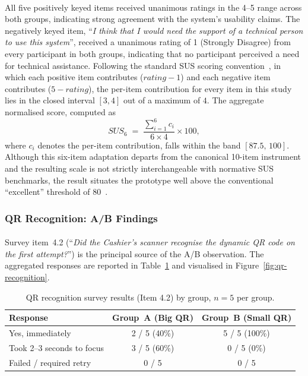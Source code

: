 \paragraph{}All five positively keyed items received unanimous ratings in the 4--5 range across both groups, indicating strong agreement with the system's usability claims. The negatively keyed item, ``\textit{I think that I would need the support of a technical person to use this system}'', received a unanimous rating of 1 (Strongly Disagree) from every participant in both groups, indicating that no participant perceived a need for technical assistance. Following the standard SUS scoring convention~\cite{brooke1996sus, bangor2008sus}, in which each positive item contributes ($\textit{rating} - 1$) and each negative item contributes ($5 - \textit{rating}$), the per-item contribution for every item in this study lies in the closed interval $[3, 4]$ out of a maximum of $4$. The aggregate normalised score, computed as
\[
\textit{SUS}_{6} \;=\; \frac{\sum_{i=1}^{6} c_i}{6 \times 4} \times 100,
\]
where $c_i$ denotes the per-item contribution, falls within the band $[87.5,\, 100]$. Although this six-item adaptation departs from the canonical 10-item instrument and the resulting scale is not strictly interchangeable with normative SUS benchmarks, the result situates the prototype well above the conventional ``excellent'' threshold of 80~\cite{bangor2008sus}.

\subsubsection{QR Recognition: A/B Findings}
\label{sect:results_uat_qr}

\paragraph{}Survey item~4.2 (``\textit{Did the Cashier's scanner recognise the dynamic QR code on the first attempt?}'') is the principal source of the A/B observation. The aggregated responses are reported in Table~\ref{tab:qr-recognition} and visualised in Figure~\ref{fig:qr-recognition}.

\begin{table}[H]
  \centering
  \caption{QR recognition survey results (Item 4.2) by group, $n = 5$ per group.}
  \label{tab:qr-recognition}
  \begin{tabular}{|l|c|c|}
    \hline
    Response & Group~A (Big QR) & Group~B (Small QR) \\\hline
    Yes, immediately & 2 / 5 (40\%) & 5 / 5 (100\%) \\\hline
    Took 2--3 seconds to focus & 3 / 5 (60\%) & 0 / 5 (0\%) \\\hline
    Failed / required retry & 0 / 5 & 0 / 5 \\\hline
  \end{tabular}
\end{table}

